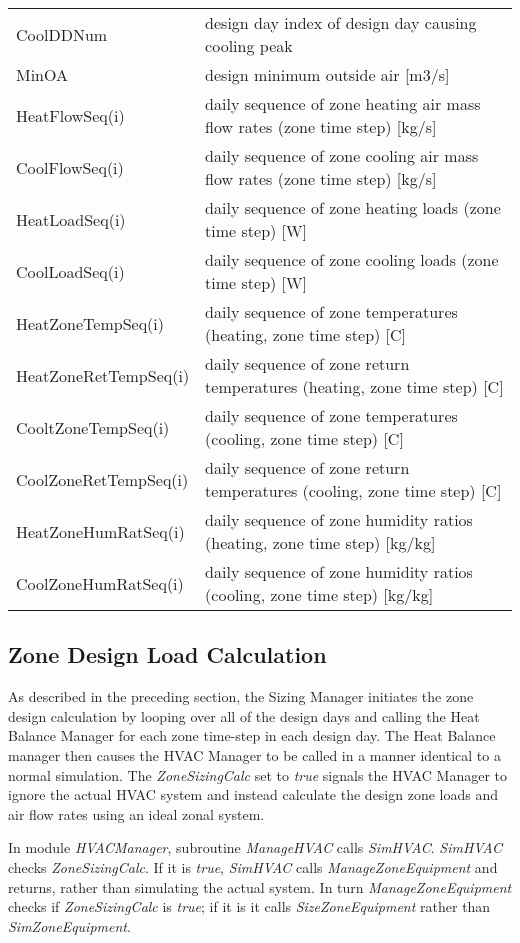 \begin{longtable}[c]{p{1.85in}p{4.13in}}
CoolDDNum & design day index of design day causing cooling peak \tabularnewline
MinOA & design minimum outside air [m3/s] \tabularnewline
HeatFlowSeq(i) & daily sequence of zone heating air mass flow rates (zone time step) [kg/s] \tabularnewline
CoolFlowSeq(i) & daily sequence of zone cooling air mass flow rates (zone time step) [kg/s] \tabularnewline
HeatLoadSeq(i) & daily sequence of zone heating loads (zone time step) [W] \tabularnewline
CoolLoadSeq(i) & daily sequence of zone cooling loads (zone time step) [W] \tabularnewline
HeatZoneTempSeq(i) & daily sequence of zone temperatures (heating, zone time step) [C] \tabularnewline
HeatZoneRetTempSeq(i) & daily sequence of zone return temperatures (heating, zone time step) [C] \tabularnewline
CooltZoneTempSeq(i) & daily sequence of zone temperatures (cooling, zone time step) [C] \tabularnewline
CoolZoneRetTempSeq(i) & daily sequence of zone return temperatures (cooling, zone time step) [C] \tabularnewline
HeatZoneHumRatSeq(i) & daily sequence of zone humidity ratios (heating, zone time step) [kg/kg] \tabularnewline
CoolZoneHumRatSeq(i) & daily sequence of zone humidity ratios (cooling, zone time step) [kg/kg] \tabularnewline
\bottomrule
\end{longtable}

\subsection{Zone Design Load Calculation}\label{zone-design-load-calculation}

As described in the preceding section, the Sizing Manager initiates the zone design calculation by looping over all of the design days and calling the Heat Balance Manager for each zone time-step in each design day. The Heat Balance manager then causes the HVAC Manager to be called in a manner identical to a normal simulation. The \emph{ZoneSizingCalc} set to \emph{true} signals the HVAC Manager to ignore the actual HVAC system and instead calculate the design zone loads and air flow rates using an ideal zonal system.

In module \emph{HVACManager}, subroutine \emph{ManageHVAC} calls \emph{SimHVAC}. \emph{SimHVAC} checks \emph{ZoneSizingCalc}. If it is \emph{true}, \emph{SimHVAC} calls \emph{ManageZoneEquipment} and returns, rather than simulating the actual system. In turn \emph{ManageZoneEquipment} checks if \emph{ZoneSizingCalc} is \emph{true}; if it is it calls \emph{SizeZoneEquipment} rather than \emph{SimZoneEquipment}.

